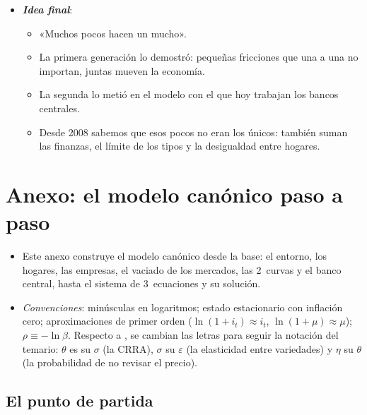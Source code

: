 \documentclass[11pt]{article}
\begin{document}
\begin{itemize}
\begin{itemize}
  \end{itemize}
\item \textbf{\emph{Idea final}}:
  \begin{itemize}
  \item «Muchos pocos hacen un mucho».
  \item La primera generación lo demostró: pequeñas fricciones que una a una no importan, juntas mueven la economía.
  \item La segunda lo metió en el modelo con el que hoy trabajan los bancos centrales.
  \item Desde 2008 sabemos que esos pocos no eran los únicos: también suman las finanzas, el límite de los tipos y la desigualdad entre hogares.
  \end{itemize}
\end{itemize}

\clearpage
\appendix

\section{Anexo: el modelo canónico paso a paso}\label{anexo:nek-derivacion}

\begin{itemize}
\item Este anexo construye el modelo canónico desde la base: el entorno, los hogares, las empresas, el vaciado de los mercados, las 2~curvas y el banco central, hasta el sistema de 3~ecuaciones y su solución\nocite{Gali2015Monetary}.
\item \emph{Convenciones}: minúsculas en logaritmos; estado estacionario con inflación cero; aproximaciones de primer orden ($\ln(1+i_t)\approx i_t$, $\ln(1+\mu)\approx\mu$); $\rho\equiv-\ln\beta$. Respecto a \textcite{Gali2015Monetary}, se cambian las letras para seguir la notación del temario: $\theta$ es su $\sigma$ (la CRRA), $\sigma$ su $\varepsilon$ (la elasticidad entre variedades) y $\eta$ su $\theta$ (la probabilidad de no revisar el precio).
\end{itemize}

\subsection{El punto de partida}\label{anexo:base}
\end{document}
